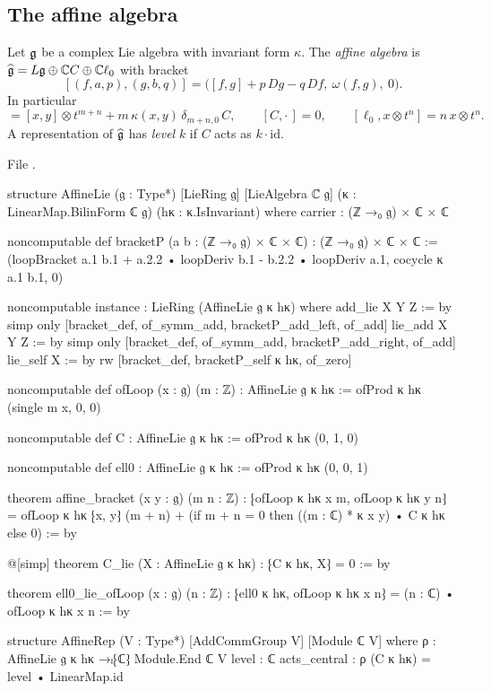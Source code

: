 \subsection{The affine algebra}

\begin{definition}\label{l02:def:affine}
Let $\mathfrak{g}$ be a complex Lie algebra with invariant form $\kappa$. The \emph{affine algebra} is
$\widehat{\mathfrak{g}} = L\mathfrak{g}\oplus{\mathbb{C}} C\oplus{\mathbb{C}}\ell_0$ with bracket
\begin{equation}\label{l02:eq:bracketP}
 [(f,a,p),(g,b,q)] = \bigl([f,g] + p\,Dg - q\,Df,\ \omega(f,g),\ 0\bigr).
\end{equation}
In particular
\begin{equation*}
 [x\otimes t^m, y\otimes t^n] = [x,y]\otimes t^{m+n} + m\,\kappa(x,y)\,\delta_{m+n,0}\,C,\qquad
 [C,\cdot\,] = 0,\qquad [\ell_0,x\otimes t^n] = n\,x\otimes t^n.
\end{equation*}
A representation of $\widehat{\mathfrak{g}}$ has \emph{level} $k$ if $C$ acts as $k\cdot\mathrm{id}$.
\end{definition}

File .
\begin{leancode}
structure AffineLie (𝔤 : Type*) [LieRing 𝔤] [LieAlgebra ℂ 𝔤]
    (κ : LinearMap.BilinForm ℂ 𝔤) (hκ : κ.IsInvariant) where
  carrier : (ℤ →₀ 𝔤) × ℂ × ℂ

noncomputable def bracketP (a b : (ℤ →₀ 𝔤) × ℂ × ℂ) : (ℤ →₀ 𝔤) × ℂ × ℂ :=
  (loopBracket a.1 b.1 + a.2.2 • loopDeriv b.1 - b.2.2 • loopDeriv a.1, cocycle κ a.1 b.1, 0)

noncomputable instance : LieRing (AffineLie 𝔤 κ hκ) where
  add_lie X Y Z := by
    simp only [bracket_def, of_symm_add, bracketP_add_left, of_add]
  lie_add X Y Z := by
    simp only [bracket_def, of_symm_add, bracketP_add_right, of_add]
  lie_self X := by
    rw [bracket_def, bracketP_self κ hκ, of_zero]

noncomputable def ofLoop (x : 𝔤) (m : ℤ) : AffineLie 𝔤 κ hκ := ofProd κ hκ (single m x, 0, 0)

noncomputable def C : AffineLie 𝔤 κ hκ := ofProd κ hκ (0, 1, 0)

noncomputable def ell0 : AffineLie 𝔤 κ hκ := ofProd κ hκ (0, 0, 1)

theorem affine_bracket (x y : 𝔤) (m n : ℤ) :
    ⁅ofLoop κ hκ x m, ofLoop κ hκ y n⁆
      = ofLoop κ hκ ⁅x, y⁆ (m + n)
        + (if m + n = 0 then ((m : ℂ) * κ x y) • C κ hκ else 0) := by

@[simp] theorem C_lie (X : AffineLie 𝔤 κ hκ) : ⁅C κ hκ, X⁆ = 0 := by

theorem ell0_lie_ofLoop (x : 𝔤) (n : ℤ) :
    ⁅ell0 κ hκ, ofLoop κ hκ x n⁆ = (n : ℂ) • ofLoop κ hκ x n := by

structure AffineRep (V : Type*) [AddCommGroup V] [Module ℂ V] where
  ρ : AffineLie 𝔤 κ hκ →ₗ⁅ℂ⁆ Module.End ℂ V
  level : ℂ
  acts_central : ρ (C κ hκ) = level • LinearMap.id
\end{leancode}

